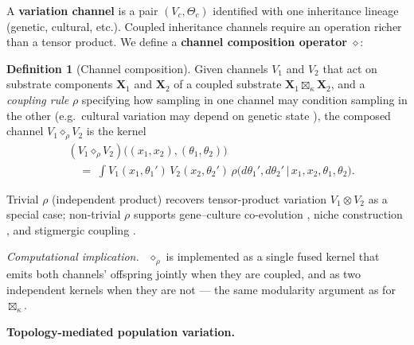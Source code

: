 \documentclass[journal]{IEEEtran}
\theoremstyle{plain}
\theoremstyle{definition}
\newtheorem{definition}[theorem]{Definition}
\theoremstyle{plain}
\newenvironment{implnote}[1][Computational implication]{%
  \par\smallskip\noindent\emph{#1.}\ }{\par\smallskip}
\newcounter{topic}[subsection]
\newcommand{\topic}[1]{%
  \refstepcounter{topic}%
  \par\smallskip\noindent\textbf{#1.}\ }
\newcommand{\X}{\mathbf{X}}
\begin{document}
A \textbf{variation channel} is a pair $(V_c, \Theta_c)$ identified with one
inheritance lineage (genetic, cultural, etc.). Coupled inheritance channels
require an operation richer than a tensor product. We define a \textbf{channel
composition operator} $\diamond$:

\begin{definition}[Channel composition]
Given channels $V_1$ and $V_2$ that act on substrate components $\X_1$ and
$\X_2$ of a coupled substrate $\X_1\boxtimes_\kappa \X_2$, and a
\emph{coupling rule} $\rho$ specifying how sampling in one channel may
condition sampling in the other (e.g.\ cultural variation may depend on
genetic state \cite{boyd1985culture}), the composed channel
$V_1 \diamond_\rho V_2$ is the kernel
\begin{align*}
  &(V_1 \diamond_\rho V_2)\!\big((x_1,x_2),(\theta_1,\theta_2)\big) \\
  &\quad=\; \int V_1(x_1,\theta_1') \, V_2(x_2,\theta_2') \,
            \rho\big(d\theta_1',d\theta_2'\,\big|\,x_1,x_2,\theta_1,\theta_2\big).
\end{align*}
\end{definition}

Trivial $\rho$ (independent product) recovers tensor-product variation
$V_1 \otimes V_2$ as a special case; non-trivial $\rho$ supports
gene--culture co-evolution \cite{boyd1985culture}, niche construction
\cite{odlingsmee2003niche}, and stigmergic coupling \cite{grasse1959stigmergie}.

\begin{implnote}
$\diamond_\rho$ is implemented as a single fused kernel that emits both
channels' offspring jointly when they are coupled, and as two independent
kernels when they are not --- the same modularity argument as for
$\boxtimes_\kappa$.
\end{implnote}

\topic{Topology-mediated population variation}\label{sec:vt}
\end{document}
